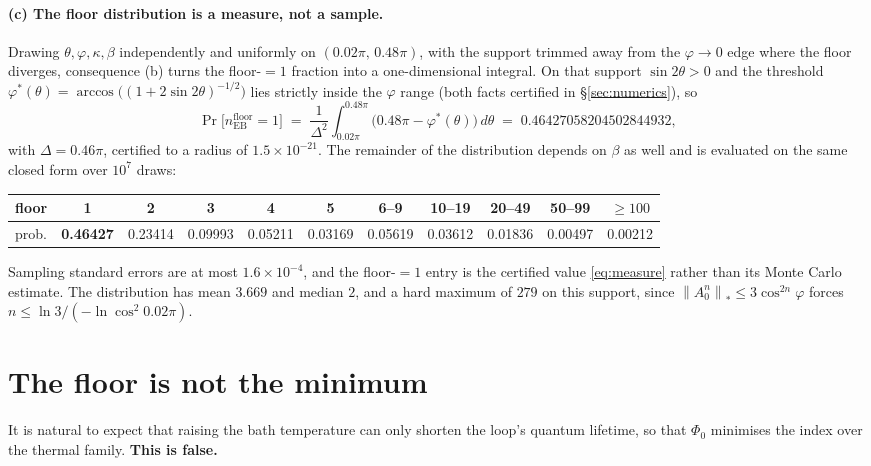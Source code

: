 \documentclass[11pt,a4paper]{article}
\theoremstyle{definition}
\theoremstyle{remark}
\newcommand{\floor}{n_{\mathrm{EB}}^{\mathrm{floor}}}
\newcommand{\nuc}[1]{\left\lVert #1 \right\rVert_{*}}
\begin{document}
\paragraph{(c) The floor distribution is a measure, not a sample.} Drawing $\theta,\varphi,\kappa,\beta$ independently and uniformly on $(0.02\pi,\,0.48\pi)$, with the support trimmed away from the $\varphi \to 0$ edge where the floor diverges, consequence (b) turns the floor-$=1$ fraction into a one-dimensional integral. On that support $\sin2\theta>0$ and the threshold $\varphi^*(\theta) = \arccos\big((1+2\sin2\theta)^{-1/2}\big)$ lies strictly inside the $\varphi$ range (both facts certified in \S\ref{sec:numerics}), so
\begin{equation}\label{eq:measure}
  \Pr\big[\floor = 1\big] \;=\; \frac{1}{\Delta^2}\int_{0.02\pi}^{0.48\pi}\!\big(0.48\pi - \varphi^*(\theta)\big)\,d\theta
  \;=\; 0.46427058204502844932,
\end{equation}
with $\Delta = 0.46\pi$, certified to a radius of $1.5\times10^{-21}$. The remainder of the distribution depends on $\beta$ as well and is evaluated on the same closed form over $10^7$ draws:

\begin{center}\footnotesize
\begin{tabular}{lcccccccccc}
\toprule
floor & 1 & 2 & 3 & 4 & 5 & 6--9 & 10--19 & 20--49 & 50--99 & $\ge100$\\
\midrule
prob. & \textbf{0.46427} & 0.23414 & 0.09993 & 0.05211 & 0.03169 & 0.05619 & 0.03612 & 0.01836 & 0.00497 & 0.00212\\
\bottomrule
\end{tabular}
\end{center}

\noindent Sampling standard errors are at most $1.6\times10^{-4}$, and the floor-$=1$ entry is the certified value \eqref{eq:measure} rather than its Monte Carlo estimate. The distribution has mean $3.669$ and median $2$, and a hard maximum of $279$ on this support, since $\nuc{A_0^n}\le3\cos^{2n}\!\varphi$ forces $n\le\ln3/(-\ln\cos^2 0.02\pi)$.

\section{The floor is not the minimum}\label{sec:valley}

It is natural to expect that raising the bath temperature can only shorten the loop's quantum lifetime, so that $\Phi_0$ minimises the index over the thermal family. \textbf{This is false.}
\end{document}

